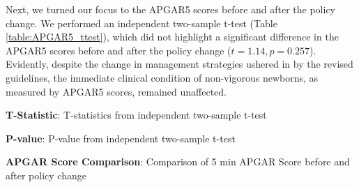 \documentclass[11pt]{article}
\begin{document}
\begin{table}[h]
\caption{Perform Chi-Square Test for Neonatal Endotracheal Suction before and after new policy}
\label{table:endotracheal_suction_chi2}
\begin{threeparttable}
\renewcommand{\TPTminimum}{\linewidth}
\begin{tablenotes}
\footnotesize
\item 
\end{tablenotes}
\end{threeparttable}
\end{table}


Next, we turned our focus to the APGAR5 scores before and after the policy change. We performed an independent two-sample t-test (Table \ref{table:APGAR5_ttest}), which did not highlight a significant difference in the APGAR5 scores before and after the policy change ($t = 1.14, p = 0.257$). Evidently, despite the change in management strategies ushered in by the revised guidelines, the immediate clinical condition of non-vigorous newborns, as measured by APGAR5 scores, remained unaffected. 

\begin{table}[h]
\caption{Perform T-test for APGAR5 Scores before and after the policy change}
\label{table:APGAR5_ttest}
\begin{threeparttable}
\renewcommand{\TPTminimum}{\linewidth}
\begin{tablenotes}
\footnotesize
\item \textbf{T-Statistic}: T-statistics from independent two-sample t-test
\item \textbf{P-value}: P-value from independent two-sample t-test
\item \textbf{APGAR Score Comparison}: Comparison of 5 min APGAR Score before and after policy change
\end{tablenotes}
\end{threeparttable}
\end{table}
\end{document}
